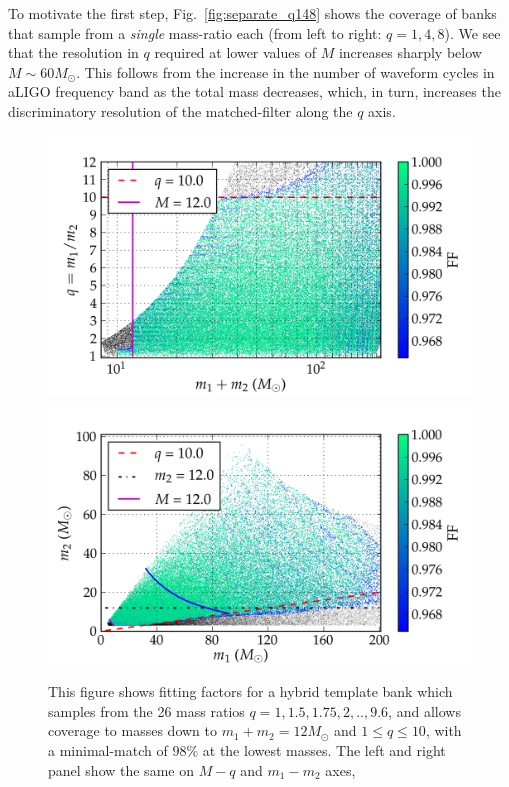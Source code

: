 To motivate the first step, Fig.~\ref{fig:separate_q148} shows the coverage of
banks that sample from a {\em single} mass-ratio each (from left to right: $q=1,4,8$). We see that the resolution
in $q$ required at lower values of $M$ increases sharply below 
$M\sim 60M_\odot$. This follows from the increase in the number of waveform
cycles in aLIGO frequency band as the total mass decreases, which, in turn,
increases the discriminatory resolution of the matched-filter along the $q$ axis.
\begin{figure}
\begin{center}
\includegraphics[width=0.9\columnwidth]{figures/nrhybbank/bank_seperate_q1-4-35-4-65-9-6_01_mtot200_match-tiny.png}
\includegraphics[width=0.9\columnwidth]{figures/nrhybbank/bank_seperate_q1-4-35-4-65-9-6_01_m1m2200_match-tiny.png}
\caption{\label{fig:templatebank_halfMassRatios}This figure shows
  fitting factors for a hybrid template bank which samples from the 26 mass
  ratios $q=1,1.5,1.75,2,..,9.6$, and allows coverage to masses down to 
  $m_1 + m_2 = 12M_{\odot}$ and $1\leq q\leq 10$, with a minimal-match of $98\%$
  at the lowest masses. 
  The left and right panel show the same on $M-q$ and $m_1-m_2$ axes, 
}
\end{center}
\end{figure}
